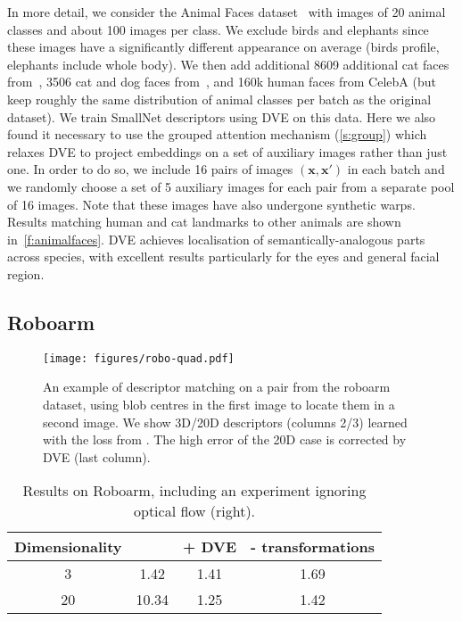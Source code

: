 \documentclass[10pt,twocolumn,letterpaper]{article}
\newcommand{\bx}{\mathbf{x}}
\begin{document}
In more detail, we consider the Animal Faces dataset~\cite{si2012learning} with images of 20 animal classes and about 100 images per class.
We exclude birds and elephants since these images have a significantly different appearance on average (birds profile, elephants include whole body).
We then add additional 8609 additional cat faces from~\cite{zhang2008cat}, 3506 cat and dog faces from~\cite{parkhi12a}, and 160k human faces from CelebA (but keep roughly the same distribution of animal classes per batch as the original dataset).
We train SmallNet descriptors using DVE on this data.  Here we also found it necessary to use the grouped attention mechanism (\cref{s:group}) which relaxes DVE to project embeddings on a set of auxiliary images rather than just one.
In order to do so, we include 16 pairs of images $(\bx,\bx')$ in each batch and we randomly choose a set of 5 auxiliary images for each pair from a separate pool of 16 images.
Note that these images have also undergone synthetic warps.  Results matching human and cat landmarks to other animals are shown in~\cref{f:animalfaces}.  DVE achieves localisation of semantically-analogous parts across species, with excellent results particularly for the eyes and general facial region.

\subsection{Roboarm}\label{s:robo}

\begin{figure}[h]
\centering
\texttt{[image: figures/robo-quad.pdf]}
\caption{An example of descriptor matching on a pair from the roboarm dataset, using blob centres in the first image to locate them in a second image.
We show 3D/20D descriptors (columns 2/3) learned with the loss from \cite{thewlis17Bunsupervised}.
The high error of the 20D case is corrected by DVE (last column).}\label{f:descmatchingroboarm}
\vspace{-0.25cm}
\end{figure} 


\begin{table}[h]
\centering
\setlength{\tabcolsep}{0.5em}
	\begin{tabular}{cccc}
		\toprule
		Dimensionality    & \cite{thewlis17Bunsupervised} & + DVE   & - transformations \\
		\midrule
		3                 & 1.42                          & 1.41                & 1.69              \\
		20                & 10.34                         & 1.25                & 1.42              \\
		\bottomrule
	\end{tabular}
    \medskip
	\caption{Results on Roboarm, including an experiment ignoring optical flow (right).}
	\label{t:roboarmresults}
\end{table}
\end{document}
